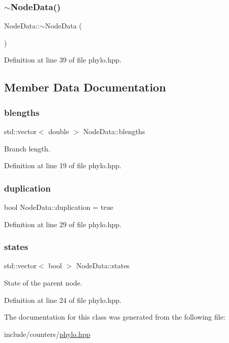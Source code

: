 \subsubsection{\texorpdfstring{$\sim$\+Node\+Data()}{~NodeData()}}
{\footnotesize\ttfamily Node\+Data\+::$\sim$\+Node\+Data (\begin{DoxyParamCaption}{ }\end{DoxyParamCaption})\hspace{0.3cm}{\ttfamily [inline]}}



Definition at line 39 of file phylo.\+hpp.



\subsection{Member Data Documentation}
\mbox{\label{class_node_data_a02da5f097c105813216d87ef89ad7bd4}} 
\subsubsection{\texorpdfstring{blengths}{blengths}}
{\footnotesize\ttfamily std\+::vector$<$ double $>$ Node\+Data\+::blengths}

Branch length. 

Definition at line 19 of file phylo.\+hpp.

\mbox{\label{class_node_data_a6c21d52091bb4fa6e3d431856da17caa}} 
\subsubsection{\texorpdfstring{duplication}{duplication}}
{\footnotesize\ttfamily bool Node\+Data\+::duplication = true}



Definition at line 29 of file phylo.\+hpp.

\mbox{\label{class_node_data_a33caaadde6afe892624501bdb0edaea6}} 
\subsubsection{\texorpdfstring{states}{states}}
{\footnotesize\ttfamily std\+::vector$<$ bool $>$ Node\+Data\+::states}

State of the parent node. 

Definition at line 24 of file phylo.\+hpp.



The documentation for this class was generated from the following file\+:\begin{DoxyCompactItemize}
\item 
include/counters/\hyperlink{phylo_8hpp}{phylo.\+hpp}\end{DoxyCompactItemize}
